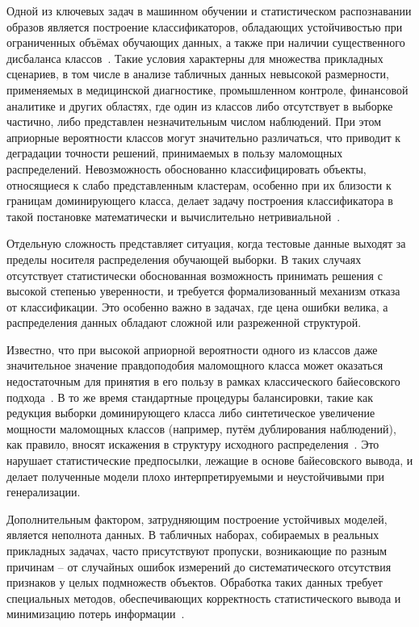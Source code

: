 
{\actuality} 

Одной из ключевых задач в машинном обучении и статистическом распознавании образов является построение классификаторов, обладающих устойчивостью при ограниченных объёмах обучающих данных, а также при наличии существенного дисбаланса классов~\cite{he2009learning, japkowicz2002class}. Такие условия характерны для множества прикладных сценариев, в том числе в анализе табличных данных невысокой размерности, применяемых в медицинской диагностике, промышленном контроле, финансовой аналитике и других областях, где один из классов либо отсутствует в выборке частично, либо представлен незначительным числом наблюдений. При этом априорные вероятности классов могут значительно различаться, что приводит к деградации точности решений, принимаемых в пользу маломощных распределений. Невозможность обоснованно классифицировать объекты, относящиеся к слабо представленным кластерам, особенно при их близости к границам доминирующего класса, делает задачу построения классификатора в такой постановке математически и вычислительно нетривиальной~\cite{elkan2001foundations}.

Отдельную сложность представляет ситуация, когда тестовые данные выходят за пределы носителя распределения обучающей выборки. В таких случаях отсутствует статистически обоснованная возможность принимать решения с высокой степенью уверенности, и требуется формализованный механизм отказа от классификации. Это особенно важно в задачах, где цена ошибки велика, а распределения данных обладают сложной или разреженной структурой.

Известно, что при высокой априорной вероятности одного из классов даже значительное значение правдоподобия маломощного класса может оказаться недостаточным для принятия в его пользу в рамках классического байесовского подхода~\cite{bishop2006pattern}. В то же время стандартные процедуры балансировки, такие как редукция выборки доминирующего класса либо синтетическое увеличение мощности маломощных классов (например, путём дублирования наблюдений), как правило, вносят искажения в структуру исходного распределения~\cite{chawla2002smote}. Это нарушает статистические предпосылки, лежащие в основе байесовского вывода, и делает полученные модели плохо интерпретируемыми и неустойчивыми при генерализации.

Дополнительным фактором, затрудняющим построение устойчивых моделей, является неполнота данных. В табличных наборах, собираемых в реальных прикладных задачах, часто присутствуют пропуски, возникающие по разным причинам -- от случайных ошибок измерений до систематического отсутствия признаков у целых подмножеств объектов. Обработка таких данных требует специальных методов, обеспечивающих корректность статистического вывода и минимизацию потерь информации~\cite{little1995statistical}.

